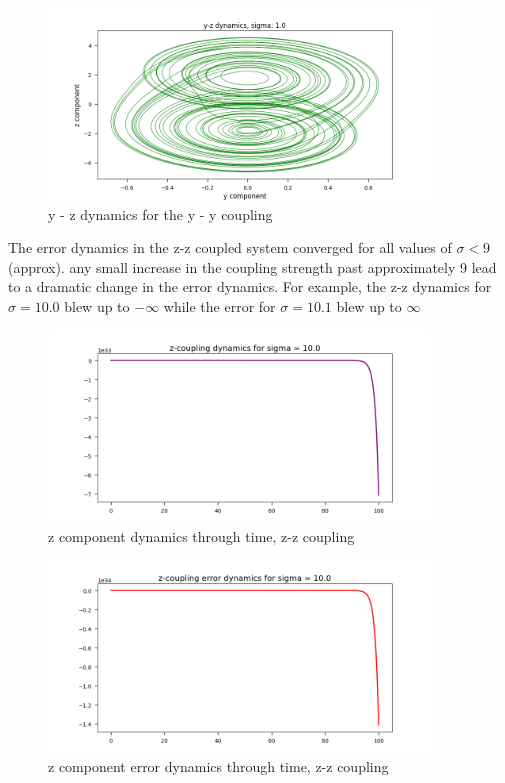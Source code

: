 \documentclass{article}
\begin{document}
\begin{figure}[H]
\centering
\includegraphics[width = 4in, height = 2in]{y_coupled_s1_yz.png}
\caption{y - z dynamics for the y - y coupling}
\end{figure}

The error dynamics in the z-z coupled system converged for all values of $\sigma < 9$ (approx). any small increase in the
coupling strength past approximately 9 lead to a dramatic change in the error dynamics.
For example, the z-z dynamics for $\sigma = 10.0$ blew up to $-\infty$ while the error for $\sigma = 10.1$ blew up to $\infty$

\begin{figure}[H]
\centering
\includegraphics[width = 4in, height = 2in]{z_coupling_z_dynamics_s10.png}
\caption{z component dynamics through time, z-z coupling}
\end{figure}

\begin{figure}[H]
\centering
\includegraphics[width = 4in, height = 2in]{z_coupling_z_error_s10.png}
\caption{z component error dynamics through time, z-z coupling}
\end{figure}
\end{document}
